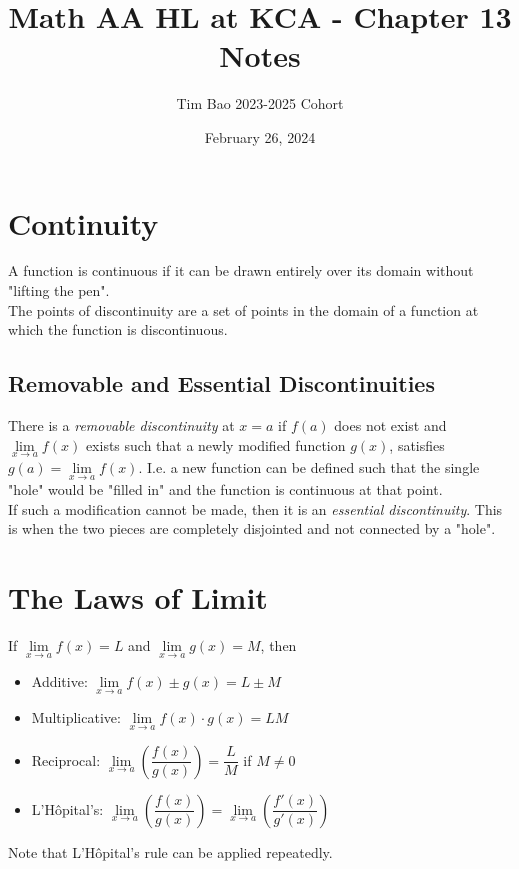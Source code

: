 \documentclass[11pt]{article}
\title{Math AA HL at KCA - Chapter 13 Notes}
\author{Tim Bao 2023-2025 Cohort}
\date{February 26, 2024}
\newcommand{\lb}{\\[8pt]}
\begin{document}
\maketitle
\pagebreak
\tableofcontents
\pagebreak

\section{Continuity}

A function is continuous if it can be drawn entirely over its domain without "lifting the pen".\lb
The points of discontinuity are a set of points in the domain of a function at which the function is discontinuous.\lb

\subsection{Removable and Essential Discontinuities}

There is a \textit{removable discontinuity} at $x = a$ if $f(a)$ does not exist and $\lim\limits_{x\to a}f(x)$ exists such that a newly modified function $g(x)$, satisfies $g(a) = \lim\limits_{x \to a}f(x)$. I.e. a new function can be defined such that the single "hole" would be "filled in" and the function is continuous at that point.\lb
If such a modification cannot be made, then it is an \textit{essential discontinuity}. This is when the two pieces are completely disjointed and not connected by a "hole".

\pagebreak

\section{The Laws of Limit}

If $\lim\limits_{x\to a}{f(x)} = L$ and $\lim\limits_{x\to a}{g(x)} = M$, then
\begin{itemize}
  \item Additive: $\lim\limits_{x\to a}{f(x) \pm g(x)} = L\pm M$
  \item Multiplicative: $\lim\limits_{x\to a}{f(x) \cdot g(x)} = LM$
  \item Reciprocal: $\lim\limits_{x\to a}\left(\dfrac{f(x)}{g(x)}\right) = \dfrac{L}{M}$ if $M \not = 0$
  \item L'Hôpital's: $\lim\limits_{x\to a}\left(\dfrac{f(x)}{g(x)}\right) = \lim\limits_{x\to a}\left(\dfrac{f'(x)}{g'(x)}\right)$
\end{itemize}
\noindent Note that L'Hôpital's rule can be applied repeatedly.\\
\end{document}
